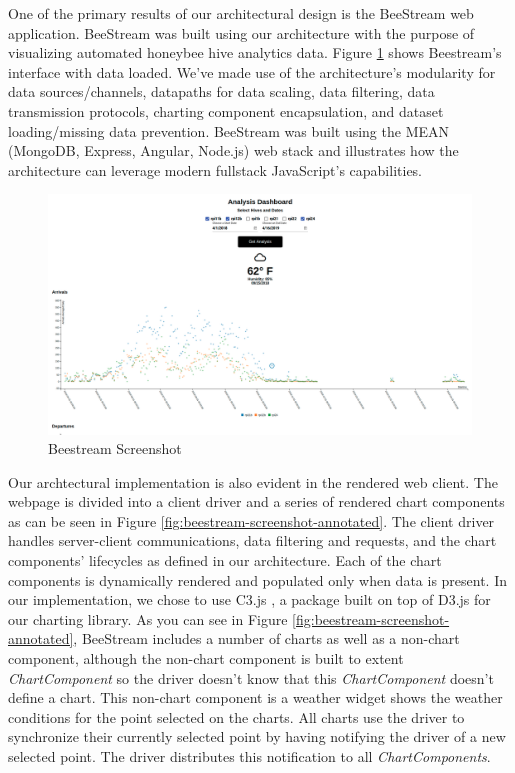 %
%
One of the primary results of our architectural design is the BeeStream web application.  BeeStream was built using our architecture with the purpose of visualizing automated honeybee hive analytics data.  Figure \ref{fig:beestream-screenshot} shows Beestream's interface with data loaded.  We've made use of the architecture's modularity for data sources/channels, datapaths for data scaling, data filtering, data transmission protocols, charting component encapsulation, and dataset loading/missing data prevention.  BeeStream was built using the MEAN (MongoDB, Express, Angular, Node.js) web stack and illustrates how the architecture can leverage modern fullstack JavaScript's capabilities.  \par
\begin{figure}
  \centering
  \includegraphics[width=6in]{images/beestream_screenshot.png}
  \caption{Beestream Screenshot}
  \label{fig:beestream-screenshot}
\end{figure}
Our archtectural implementation is also evident in the rendered web client.  The webpage is divided into a client driver and a series of rendered chart components as can be seen in Figure \ref{fig:beestream-screenshot-annotated}.  The client driver handles server-client communications, data filtering and requests, and the chart components' lifecycles as defined in our architecture.  Each of the chart components is dynamically rendered and populated only when data is present.  In our implementation, we chose to use C3.js \cite{c3js}, a package built on top of D3.js \cite{d3homepage} for our charting library.  As you can see in Figure \ref{fig:beestream-screenshot-annotated}, BeeStream includes a number of charts as well as a non-chart component, although the non-chart component is built to extent \textit{ChartComponent} so the driver doesn't know that this \textit{ChartComponent} doesn't define a chart.  This non-chart component is a weather widget shows the weather conditions for the point selected on the charts.  All charts use the driver to synchronize their currently selected point by having notifying the driver of a new selected point.  The driver distributes this notification to all \textit{ChartComponents}.

